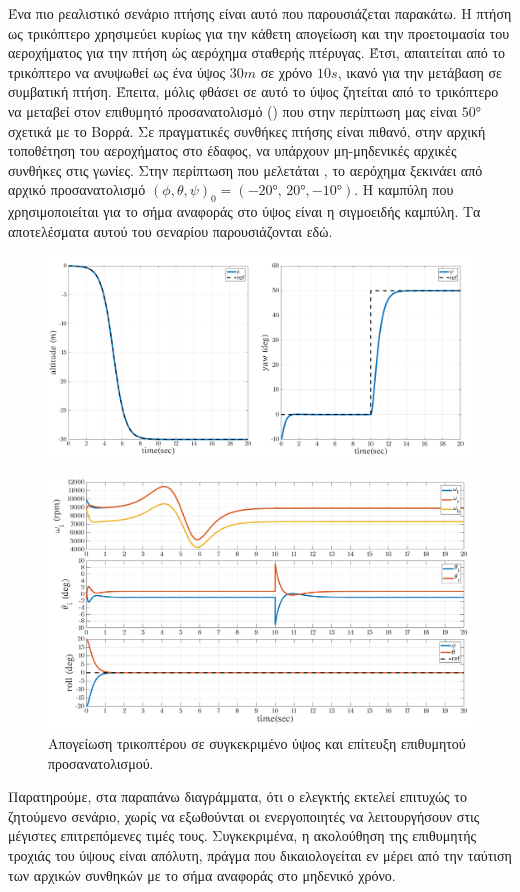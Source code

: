 Ένα πιο ρεαλιστικό σενάριο πτήσης είναι αυτό που παρουσιάζεται παρακάτω. Η πτήση
ως τρικόπτερο χρησιμεύει κυρίως για την κάθετη απογείωση και την προετοιμασία
του αεροχήματος για την πτήση ώς αερόχημα σταθερής πτέρυγας. Έτσι, απαιτείται 
από το τρικόπτερο να ανυψωθεί ως ένα ύψος $30m$ σε χρόνο $10s$, ικανό για την 
μετάβαση σε συμβατική πτήση. Έπειτα, μόλις φθάσει σε αυτό το ύψος ζητείται από 
το τρικόπτερο να μεταβεί στον επιθυμητό προσανατολισμό () που στην 
περίπτωση μας είναι $\ang{50}$ σχετικά με το Βορρά. Σε πραγματικές συνθήκες 
πτήσης είναι πιθανό, στην αρχική τοποθέτηση του αεροχήματος στο έδαφος, να 
υπάρχουν μη-μηδενικές αρχικές συνθήκες στις γωνίες. Στην περίπτωση που μελετάται
, το αερόχημα ξεκινάει από αρχικό προσανατολισμό $\left(\phi, \theta, 
\psi\right)_0 = \left(\ang{-20},\,\ang{20},\ang{-10}\right)$. Η καμπύλη που 
χρησιμοποιείται για το σήμα αναφοράς στο ύψος είναι η σιγμοειδής καμπύλη. Τα 
αποτελέσματα αυτού του σεναρίου παρουσιάζονται εδώ.
\begin{figure}[H]
    \centering
    \includegraphics[width=1\textwidth]{Control/Nominal/fig_sigmoid_1.png}
\end{figure}
\begin{figure}[H]
    \centering
    \includegraphics[width=1\textwidth]{Control/Nominal/fig_sigmoid_2.png}
    \caption{Απογείωση τρικοπτέρου σε συγκεκριμένο ύψος και επίτευξη επιθυμητού 
    προσανατολισμού.}\label{fig:takeoff}
\end{figure}

Παρατηρούμε, στα παραπάνω διαγράμματα, ότι ο ελεγκτής εκτελεί επιτυχώς το 
ζητούμενο σενάριο, χωρίς να εξωθούνται οι ενεργοποιητές να λειτουργήσουν στις 
μέγιστες επιτρεπόμενες τιμές τους. Συγκεκριμένα, η ακολούθηση της επιθυμητής 
τροχιάς του ύψους είναι απόλυτη, πράγμα που δικαιολογείται εν μέρει από την 
ταύτιση των αρχικών συνθηκών με το σήμα αναφοράς στο μηδενικό χρόνο.
